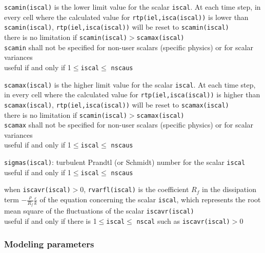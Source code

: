 {{\tt scamin(iscal)} is the lower limit value for the scalar {\tt iscal}. At each time step,
in every cell where the calculated value for {\tt rtp(iel,isca(iscal))} is lower than
\mbox{\tt scamin(iscal)}, {\tt rtp(iel,isca(iscal))} will be reset to
\mbox{\tt scamin(iscal)}\\
there is no limitation if {\tt scamin(iscal)}$>${\tt scamax(iscal)}\\
{\tt scamin} shall not be specified for non-user scalars (specific physics) or for
scalar variances\\
useful if and only if 1$\leqslant${\tt iscal}$\leqslant$ {\tt nscaus}}

{{\tt scamax(iscal)} is the higher limit value for the scalar {\tt iscal}. At each time step,
in every cell where the calculated value for {\tt rtp(iel,isca(iscal))} is higher than
\mbox{\tt scamax(iscal)}, {\tt rtp(iel,isca(iscal))} will be reset to
\mbox{\tt scamax(iscal)}\\
there is no limitation if {\tt scamin(iscal)}$>${\tt scamax(iscal)}\\
{\tt scamax} shall not be specified for non-user scalars (specific physics)
 or for scalar variances\\
useful if and only if 1$\leqslant${\tt iscal}$\leqslant$ {\tt nscaus}}

{{\tt sigmas(iscal)}: turbulent Prandtl (or Schmidt) number for the scalar
 {\tt iscal}\\
useful if and only if  1$\leqslant${\tt iscal}$\leqslant$ {\tt nscaus}}

{when {\tt iscavr(iscal)}$>$0, {\tt rvarfl(iscal)} is the coefficient $R_f$ in
the dissipation term $\displaystyle -\frac{\rho}{R_f}\frac{\varepsilon}{k}$
of the equation concerning the scalar {\tt iscal},
which represents the root mean square of the
fluctuations of the scalar {\tt iscavr(iscal)}\\
useful if and only if there is 1$\leqslant${\tt iscal}$\leqslant$ {\tt nscal} such as
 {\tt iscavr(iscal)}$>$0}


\subsubsection{Modeling parameters}

